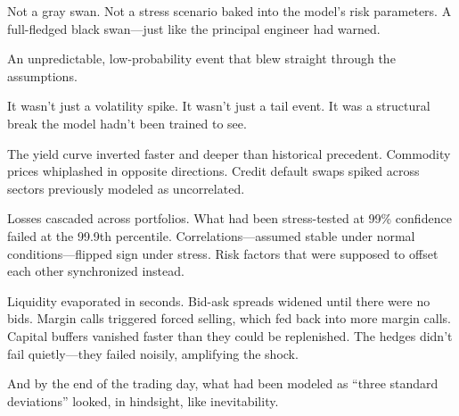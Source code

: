 Not a gray swan.  
Not a stress scenario baked into the model’s risk parameters.  
A full-fledged black swan—just like the principal engineer had warned.  

An unpredictable, low-probability event that blew straight through the assumptions.

It wasn’t just a volatility spike.  
It wasn’t just a tail event.  
It was a structural break the model hadn’t been trained to see.

The yield curve inverted faster and deeper than historical precedent.  
Commodity prices whiplashed in opposite directions.  
Credit default swaps spiked across sectors previously modeled as uncorrelated.

Losses cascaded across portfolios.  
What had been stress-tested at 99\% confidence failed at the 99.9th percentile.  
Correlations—assumed stable under normal conditions—flipped sign under stress.  
Risk factors that were supposed to offset each other synchronized instead.

Liquidity evaporated in seconds.  
Bid-ask spreads widened until there were no bids.  
Margin calls triggered forced selling, which fed back into more margin calls.  
Capital buffers vanished faster than they could be replenished.  
The hedges didn’t fail quietly—they failed noisily, amplifying the shock.

And by the end of the trading day,  
what had been modeled as “three standard deviations”  
looked, in hindsight,  
like inevitability.

\medskip

